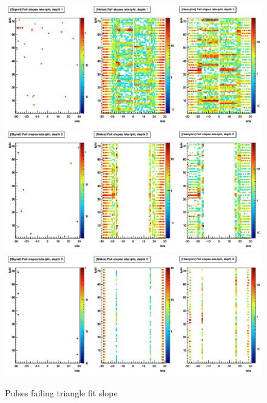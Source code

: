 \begin{figure}
\includegraphics[width=120mm]{DailyLog/6352/6352_Comparison20_Comparison_HFailSlopesIEtaIPhiDepth1}
\includegraphics[width=120mm]{DailyLog/6352/6352_Comparison20_Comparison_HFailSlopesIEtaIPhiDepth2}
\includegraphics[width=120mm]{DailyLog/6352/6352_Comparison20_Comparison_HFailSlopesIEtaIPhiDepth3}
\caption{Pulses failing triangle fit slope}
\label{Figure_6352_FailSlopes_Geometry}
\end{figure}

